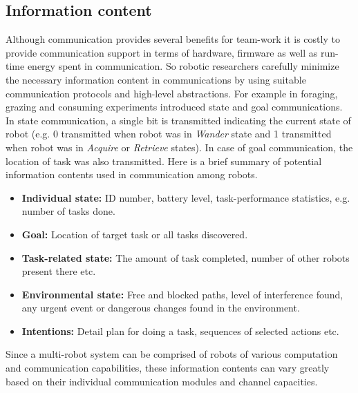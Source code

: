 \subsection{Information content}
Although communication provides several benefits for team-work it is costly to provide communication support in terms of hardware, firmware as well as run-time energy spent in communication. So robotic researchers carefully minimize the necessary information content in communications by using suitable communication protocols and high-level abstractions. For example in foraging, grazing and consuming experiments  introduced state and goal communications. In state communication, a single bit is transmitted indicating the current state of robot (e.g. 0 transmitted when robot was in {\em Wander} state and 1 transmitted when robot was in {\em Acquire} or {\em Retrieve} states). In case of goal communication, the location of task was also transmitted. Here is a brief summary of potential information contents used in communication among robots.
\begin{itemize}
\item \textbf{Individual state:} ID number, battery level, task-performance statistics, e.g. number of tasks done.
\item \textbf{Goal:} Location of target task or all tasks discovered.
\item \textbf{Task-related state:} The amount of task completed, number of other robots present there etc.
\item \textbf{Environmental state:} Free and blocked paths, level of interference found, any urgent event or dangerous changes found in the environment.
\item \textbf{Intentions:} Detail plan for doing a task, sequences of selected actions etc.
\end{itemize}
 Since a multi-robot system can be comprised of robots of various computation and communication capabilities, these information contents can vary greatly based on their individual communication modules and channel capacities.
